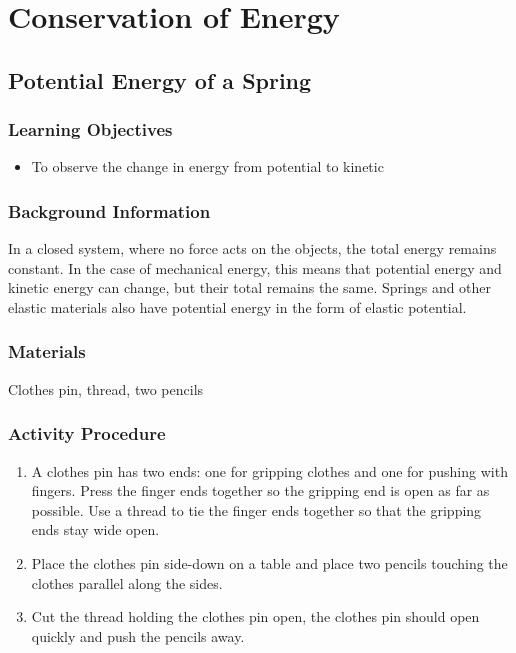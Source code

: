 \section{Conservation of Energy}

\subsection{Potential Energy of a Spring}

\subsubsection*{Learning Objectives}
\begin{itemize}
\item{To observe the change in energy from potential to kinetic}
\end{itemize}

\subsubsection*{Background Information}
In a closed system, where no force acts on the objects, the total energy remains constant.  In the case of mechanical energy, this means that potential energy and kinetic energy can change, but their total remains the same.  Springs and other elastic materials also have potential energy in the form of elastic potential.

\subsubsection{Materials} 
Clothes pin, thread, two pencils\\

\subsubsection{Activity Procedure}
\begin{enumerate}
\item{A clothes pin has two ends: one for gripping clothes and one for pushing with fingers. Press the finger ends together so the gripping end is open as far as possible. Use a thread to tie the finger ends together so that the gripping ends stay wide open.}
\item{Place the clothes pin side-down on a table and place two pencils touching the clothes parallel along the sides.}
\item{Cut the thread holding the clothes pin open, the clothes pin should open quickly and push the pencils away.}
\end{enumerate}

